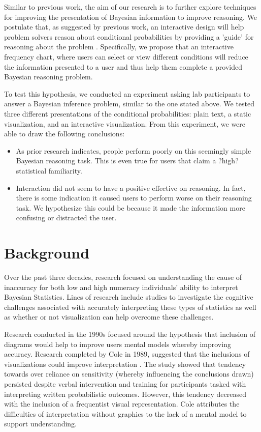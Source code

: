 Similar to previous work, the aim of our research is to further explore
techniques for improving the presentation of Bayesian information to improve
reasoning. We postulate that, as suggested by previous work, an interactive
design will help problem solvers reason about conditional probabilities by
providing a 'guide' for reasoning about the problem \cite{Tsai2011}. Specifically, we propose that an interactive frequency chart, where users can select or view
different conditions will reduce the information presented to a user and thus
help them complete a provided Bayesian reasoning problem.

To test this hypothesis, we conducted an experiment asking lab participants to answer a Bayesian inference problem, similar to the one
stated above. We tested three different presentations of the conditional
probabilities: plain text, a static visualization, and an interactive
visualization. From this experiment, we were able to draw the following
conclusions:

\begin{itemize}
    \item As prior research indicates, people perform poorly on this seemingly simple Bayesian reasoning task. This is even true for users that claim a ?high? statistical familiarity.
    \item Interaction did not seem to have a positive effective on reasoning. In fact, there is some indication it caused users to perform worse on their reasoning task. We hypothesize this could be because it made the information more confusing or distracted the user. 
\end{itemize}


\section{Background}
Over the past three decades, research focused on understanding the cause of inaccuracy for both low and high numeracy individuals'
ability to interpret Bayesian Statistics. Lines of research include studies to
investigate the cognitive challenges associated with accurately interpreting
these types of statistics as well as whether or not visualization can help
overcome these challenges. 

Research conducted in the 1990s focused around the hypothesis that inclusion
of diagrams would help to improve users mental models whereby improving
accuracy. Research completed by Cole in 1989, suggested that the
inclusions of visualizations could improve interpretation \cite{Cole1989}. The study showed
that tendency towards over reliance on sensitivity (whereby influencing the
conclusions drawn) persisted despite verbal intervention and
training for participants tasked with interpreting written probabilistic
outcomes. However, this tendency decreased with the inclusion of a
frequentist visual representation. Cole attributes the difficulties of
interpretation without graphics to the lack of a mental model to support
understanding.

